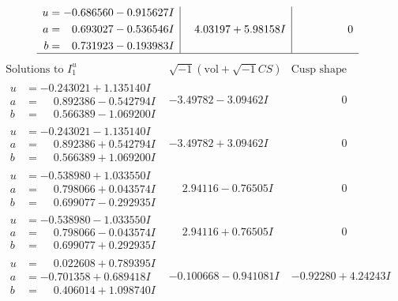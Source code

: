 \documentclass[1p]{elsarticle_modified}
\theoremstyle{definition}
\newcommand{\I}{\sqrt{-1}}
\begin{document}
$$\begin{array}{c|c|c}
\begin{aligned}
u &= -0.686560 - 0.915627 I \\
a &= \phantom{-}0.693027 - 0.536546 I \\
b &= \phantom{-}0.731923 - 0.193983 I\end{aligned}
 & \phantom{-}4.03197 + 5.98158 I & \phantom{-0.000000 } 0\\
 \hline 
 \end{array}$$\newpage$$\begin{array}{c|c|c}  
\text{Solutions to }I^u_{1}& \I (\text{vol} + \sqrt{-1}CS) & \text{Cusp shape}\\
 \hline 
\begin{aligned}
u &= -0.243021 + 1.135140 I \\
a &= \phantom{-}0.892386 - 0.542794 I \\
b &= \phantom{-}0.566389 - 1.069200 I\end{aligned}
 & -3.49782 - 3.09462 I & \phantom{-0.000000 } 0 \\ \hline\begin{aligned}
u &= -0.243021 - 1.135140 I \\
a &= \phantom{-}0.892386 + 0.542794 I \\
b &= \phantom{-}0.566389 + 1.069200 I\end{aligned}
 & -3.49782 + 3.09462 I & \phantom{-0.000000 } 0 \\ \hline\begin{aligned}
u &= -0.538980 + 1.033550 I \\
a &= \phantom{-}0.798066 + 0.043574 I \\
b &= \phantom{-}0.699077 - 0.292935 I\end{aligned}
 & \phantom{-}2.94116 - 0.76505 I & \phantom{-0.000000 } 0 \\ \hline\begin{aligned}
u &= -0.538980 - 1.033550 I \\
a &= \phantom{-}0.798066 - 0.043574 I \\
b &= \phantom{-}0.699077 + 0.292935 I\end{aligned}
 & \phantom{-}2.94116 + 0.76505 I & \phantom{-0.000000 } 0 \\ \hline\begin{aligned}
u &= \phantom{-}0.022608 + 0.789395 I \\
a &= -0.701358 + 0.689418 I \\
b &= \phantom{-}0.406014 + 1.098740 I\end{aligned}
 & -0.100668 - 0.941081 I & -0.92280 + 4.24243 I \\ \hline\begin{aligned}

\end{aligned}
\end{array}$$
\end{document}

